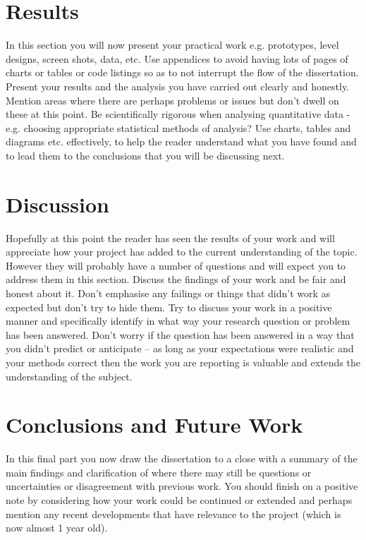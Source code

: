 \documentclass[a4paper, 12pt]{article}
\begin{document}
\section{Results} %
In this section you will now present your practical work e.g. prototypes, level designs, screen shots, data, etc. Use appendices to avoid having lots of pages of charts or tables or code listings so as to not interrupt the flow of the dissertation. Present your results and the analysis you have carried out clearly and honestly. Mention areas where there are perhaps problems or issues but don’t dwell on these at this point. Be scientifically rigorous when analysing quantitative data - e.g. choosing appropriate statistical methods of analysis? Use charts, tables and diagrams etc. effectively, to help the reader understand what you have found and to lead them to the conclusions that you will be discussing next.

\pagebreak


\section{Discussion} %
Hopefully at this point the reader has seen the results of your work and will appreciate how your project has added to the current understanding of the topic. However they will probably have a number of questions and will expect you to address them in this section. Discuss the findings of your work and be fair and honest about it. Don’t emphasise any failings or things that didn’t work as expected but don’t try to hide them. Try to discuss your work in a positive manner and specifically identify in what way your research question or problem has been answered. Don’t worry if the question has been answered in a way that you didn’t predict or anticipate – as long as your expectations were realistic and your methods correct then the work you are reporting is valuable and extends the understanding of the subject.

\pagebreak


\section{Conclusions and Future Work} %
In this final part you now draw the dissertation to a close with a summary of the main findings and clarification of where there may still be questions or uncertainties or disagreement with previous work. You should finish on a positive note by considering how your work could be continued or extended and perhaps mention any recent developments that have relevance to the project (which is now almost 1 year old).
\end{document}
